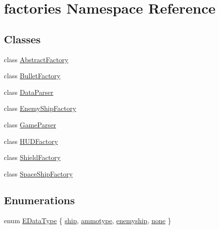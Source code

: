 \hypertarget{namespacefactories}{\section{factories \-Namespace \-Reference}
\label{da/dbc/namespacefactories}
}
\subsection*{\-Classes}
\begin{DoxyCompactItemize}
\item 
class \hyperlink{classfactories_1_1AbstractFactory}{\-Abstract\-Factory}
\item 
class \hyperlink{classfactories_1_1BulletFactory}{\-Bullet\-Factory}
\item 
class \hyperlink{classfactories_1_1DataParser}{\-Data\-Parser}
\item 
class \hyperlink{classfactories_1_1EnemyShipFactory}{\-Enemy\-Ship\-Factory}
\item 
class \hyperlink{classfactories_1_1GameParser}{\-Game\-Parser}
\item 
class \hyperlink{classfactories_1_1HUDFactory}{\-H\-U\-D\-Factory}
\item 
class \hyperlink{classfactories_1_1ShieldFactory}{\-Shield\-Factory}
\item 
class \hyperlink{classfactories_1_1SpaceShipFactory}{\-Space\-Ship\-Factory}
\end{DoxyCompactItemize}
\subsection*{\-Enumerations}
\begin{DoxyCompactItemize}
\item 
enum \hyperlink{namespacefactories_ab925b318a5bc89d3bc8a7e3fdc364023}{\-E\-Data\-Type} \{ \hyperlink{namespacefactories_ab925b318a5bc89d3bc8a7e3fdc364023ad4cc6f78fdb090b58e60f368e7e57ebf}{ship}, 
\hyperlink{namespacefactories_ab925b318a5bc89d3bc8a7e3fdc364023aa962fc51370b785923041d04c1ae1984}{ammotype}, 
\hyperlink{namespacefactories_ab925b318a5bc89d3bc8a7e3fdc364023a3d9cfe251af806cf4d75f744e4da553b}{enemyship}, 
\hyperlink{namespacefactories_ab925b318a5bc89d3bc8a7e3fdc364023aad743f2810627caaa2445bc4e82f44fd}{none}
 \}
\end{DoxyCompactItemize}


